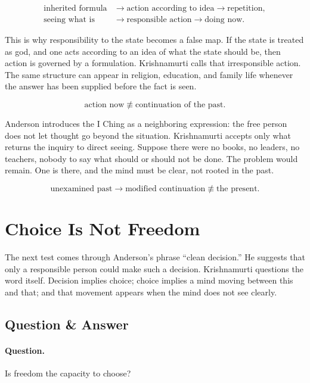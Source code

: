 \documentclass[11pt,oneside]{book}
\begin{document}
\begin{align}
\text{inherited formula}
&\longrightarrow
\text{action according to idea}
\longrightarrow
\text{repetition},\\
\text{seeing what is}
&\longrightarrow
\text{responsible action}
\longrightarrow
\text{doing now}.
\end{align}

This is why responsibility to the state becomes a false map. If the state is treated as god, and one acts according to an idea of what the state should be, then action is governed by a formulation. Krishnamurti calls that irresponsible action. The same structure can appear in religion, education, and family life whenever the answer has been supplied before the fact is seen.

\begin{equation}
\text{action now}
\not\equiv
\text{continuation of the past}.
\end{equation}

Anderson introduces the I Ching as a neighboring expression: the free person does not let thought go beyond the situation. Krishnamurti accepts only what returns the inquiry to direct seeing. Suppose there were no books, no leaders, no teachers, nobody to say what should or should not be done. The problem would remain. One is there, and the mind must be clear, not rooted in the past.

\begin{equation}
\text{unexamined past}
\longrightarrow
\text{modified continuation}
\not\equiv
\text{the present}.
\end{equation}

\section{Choice Is Not Freedom}

The next test comes through Anderson's phrase ``clean decision.'' He suggests that only a responsible person could make such a decision. Krishnamurti questions the word itself. Decision implies choice; choice implies a mind moving between this and that; and that movement appears when the mind does not see clearly.

\subsection{Question \& Answer}

\paragraph{Question.}
Is freedom the capacity to choose?
\end{document}
